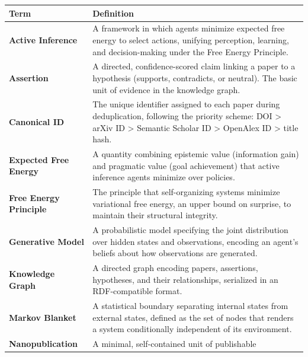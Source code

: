 \documentclass[
]{article}
\newcounter{none} %
\begin{document}
{\def\LTcaptype{none} %
\begin{longtable}[]{@{}
  >{\raggedright\arraybackslash}p{}
  >{\raggedright\arraybackslash}p{}@{}}
\toprule\noalign{}
\begin{minipage}[b]{\linewidth}\raggedright
Term
\end{minipage} & \begin{minipage}[b]{\linewidth}\raggedright
Definition
\end{minipage} \\
\midrule\noalign{}
\endhead
\bottomrule\noalign{}
\endlastfoot
\textbf{Active Inference} & A framework in which agents minimize
expected free energy to select actions, unifying perception, learning,
and decision-making under the Free Energy Principle. \\
\textbf{Assertion} & A directed, confidence-scored claim linking a paper
to a hypothesis (supports, contradicts, or neutral). The basic unit of
evidence in the knowledge graph. \\
\textbf{Canonical ID} & The unique identifier assigned to each paper
during deduplication, following the priority scheme: DOI \textgreater{}
arXiv ID \textgreater{} Semantic Scholar ID \textgreater{} OpenAlex ID
\textgreater{} title hash. \\
\textbf{Expected Free Energy} & A quantity combining epistemic value
(information gain) and pragmatic value (goal achievement) that active
inference agents minimize over policies. \\
\textbf{Free Energy Principle} & The principle that self-organizing
systems minimize variational free energy, an upper bound on surprise, to
maintain their structural integrity. \\
\textbf{Generative Model} & A probabilistic model specifying the joint
distribution over hidden states and observations, encoding an agent's
beliefs about how observations are generated. \\
\textbf{Knowledge Graph} & A directed graph encoding papers, assertions,
hypotheses, and their relationships, serialized in an RDF-compatible
format. \\
\textbf{Markov Blanket} & A statistical boundary separating internal
states from external states, defined as the set of nodes that renders a
system conditionally independent of its environment. \\
\textbf{Nanopublication} & A minimal, self-contained unit of publishable

\end{longtable}}
\end{document}

